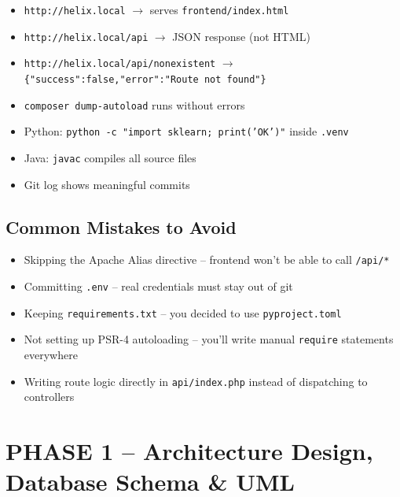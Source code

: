 \documentclass[11pt,a4paper]{report}
\newcommand{\todo}{\textcolor{helixamber}{\textbf{[ ]}}}
\newcommand{\filepath}[1]{\texttt{\small#1}}
\begin{document}
\begin{itemize}
    \item[\todo] \texttt{http://helix.local} $\rightarrow$ serves \filepath{frontend/index.html}
    \item[\todo] \texttt{http://helix.local/api} $\rightarrow$ JSON response (not HTML)
    \item[\todo] \texttt{http://helix.local/api/nonexistent} $\rightarrow$ \texttt{\{"success":false,"error":"Route not found"\}}
    \item[\todo] \texttt{composer dump-autoload} runs without errors
    \item[\todo] Python: \texttt{python -c "import sklearn; print('OK')"} inside \texttt{.venv}
    \item[\todo] Java: \texttt{javac} compiles all source files
    \item[\todo] Git log shows meaningful commits
\end{itemize}

\section*{Common Mistakes to Avoid}

\begin{warnbox}[title=Watch Out]
\begin{itemize}
    \item[$\times$] Skipping the Apache Alias directive -- frontend won't be able to call \texttt{/api/*}
    \item[$\times$] Committing \filepath{.env} -- real credentials must stay out of git
    \item[$\times$] Keeping \filepath{requirements.txt} -- you decided to use \filepath{pyproject.toml}
    \item[$\times$] Not setting up PSR-4 autoloading -- you'll write manual \texttt{require} statements everywhere
    \item[$\times$] Writing route logic directly in \filepath{api/index.php} instead of dispatching to controllers
\end{itemize}
\end{warnbox}

\chapter{PHASE 1 -- Architecture Design, Database Schema \& UML}
\end{document}
